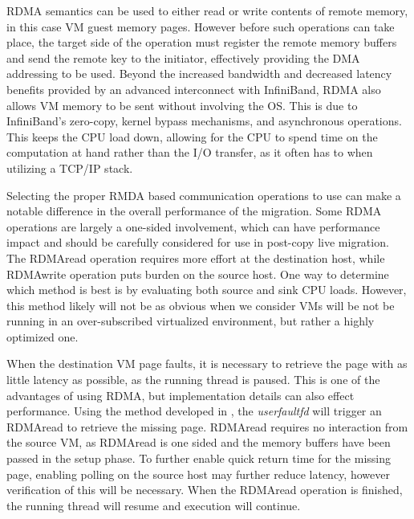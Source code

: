 RDMA semantics can be used to either read or write contents of remote memory, in this case VM guest memory pages. However before such operations can take place, the target side of the operation must register the remote memory buffers and send the remote key to the initiator, effectively providing the DMA addressing to be used. Beyond the increased bandwidth and decreased latency benefits provided by an advanced interconnect with InfiniBand, RDMA also allows VM memory to be sent without involving the OS. This is due to InfiniBand's zero-copy, kernel bypass mechanisms, and asynchronous operations. This keeps the CPU load down, allowing for the CPU to spend time on the computation at hand rather than the I/O transfer, as it often has to when utilizing a TCP/IP stack. 
 
Selecting the proper RMDA based communication operations to use can make a notable difference in the overall performance of the migration.  
Some RDMA operations are largely a one-sided involvement, which can have performance impact and should be carefully considered for use in post-copy live migration. The RDMAread operation requires more effort at the destination host, while RDMAwrite operation puts burden on the source host.  One way to determine which method is best is by evaluating both source and sink CPU loads.  However, this method likely will not be as obvious when we consider VMs will be not be running in an over-subscribed virtualized environment, but rather a highly optimized one. 

When the destination VM page faults, it is necessary to retrieve the page with as little latency as possible, as the running thread is paused. This is one of the advantages of using RDMA, but implementation details can also effect performance. Using the method developed in \cite{www-kvm-postcopy}, the \emph{userfaultfd} will trigger an RDMAread to retrieve the missing page. RDMAread requires no interaction from the source VM, as RDMAread is one sided and the memory buffers have been passed in the setup phase. To further enable quick return time for the missing page, enabling polling on the source host may further reduce latency, however verification of this will be necessary. When the RDMAread operation is finished, the running thread will resume and execution will continue.






